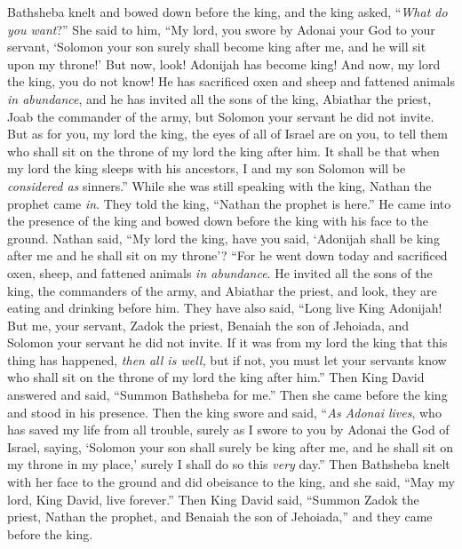 \begin{biblechapter}
\verse Bathsheba knelt and bowed down before the king, and the king asked, “\textit{What do you want}?”
\verse She said to him, “My lord, you swore by Adonai your God to your servant, ‘Solomon your son surely shall become king after me, and he will sit upon my throne!’
\verse But now, look! Adonijah has become king! And now, my lord the king, you do not know!
\verse He has sacrificed oxen and sheep and fattened animals \textit{in abundance}, and he has invited all the sons of the king, Abiathar the priest, Joab the commander of the army, but Solomon your servant he did not invite.
\verse But as for you, my lord the king, the eyes of all of Israel are on you, to tell them who shall sit on the throne of my lord the king after him.
\verse It shall be that when my lord the king sleeps with his ancestors, I and my son Solomon will be \textit{considered as} sinners.”
\verse While she was still speaking with the king, Nathan the prophet came \textit{in}.
\verse They told the king, “Nathan the prophet is here.” He came into the presence of the king and bowed down before the king with his face to the ground.
\verse Nathan said, “My lord the king, have you said, ‘Adonijah shall be king after me and he shall sit on my throne’?
\verse “For he went down today and sacrificed oxen, sheep, and fattened animals \textit{in abundance}. He invited all the sons of the king, the commanders of the army, and Abiathar the priest, and look, they are eating and drinking before him. They have also said, “Long live King Adonijah!
\verse But me, your servant, Zadok the priest, Benaiah the son of Jehoiada, and Solomon your servant he did not invite.
\verse If it was from my lord the king that this thing has happened, \textit{then all is well,} but if not, you must let your servants know who shall sit on the throne of my lord the king after him.”
\verse Then King David answered and said, “Summon Bathsheba for me.” Then she came before the king and stood in his presence.
\verse Then the king swore and said, “\textit{As Adonai lives}, who has saved my life from all trouble,
\verse surely as I swore to you by Adonai the God of Israel, saying, ‘Solomon your son shall surely be king after me, and he shall sit on my throne in my place,’ surely I shall do so this \textit{very} day.”
\verse Then Bathsheba knelt with her face to the ground and did obeisance to the king, and she said, “May my lord, King David, live forever.”
 Then King David said, “Summon Zadok the priest, Nathan the prophet, and Benaiah the son of Jehoiada,” and they came before the king.

\end{biblechapter}
